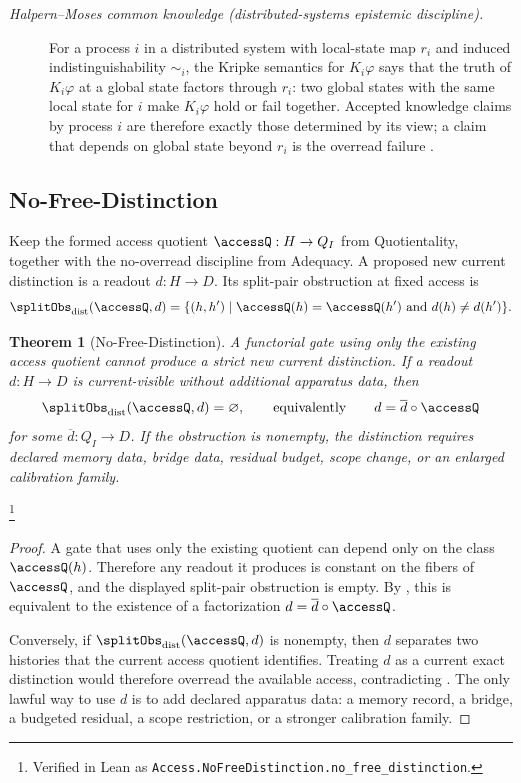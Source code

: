 \documentclass[11pt]{article}
\newtheorem{theorem}{Theorem}[section]
\theoremstyle{definition}
\begin{document}
\begin{description}
\item[\emph{Halpern--Moses common knowledge (distributed-systems
epistemic discipline).}]
For a process \(i\) in a distributed system with local-state map
\(r_i\) and induced indistinguishability \(\sim_i\), the Kripke
semantics for \(K_i\varphi\) says that the truth of
\(K_i\varphi\) at a global state factors through \(r_i\): two
global states with the same local state for \(i\) make
\(K_i\varphi\) hold or fail together.  Accepted knowledge claims
by process \(i\) are therefore exactly those determined by its
view; a claim that depends on global state beyond \(r_i\) is the
overread failure
\citep{HalpernMoses1990KnowledgeCommonKnowledge}.
\end{description}

\subsection{No-Free-Distinction}\label{sec:access:no-free-distinction}

Keep the formed access quotient \(\accessQ:H\to Q_I\) from
Quotientality, together with the no-overread discipline from
Adequacy.  A proposed new current distinction is a readout
\(d:H\to D\).  Its split-pair obstruction at fixed access is
\[
  \splitObs_{\mathrm{dist}}(\accessQ,d)
  =
  \{(h,h')\mid \accessQ(h)=\accessQ(h')\ \text{and}\ d(h)\ne d(h')\}.
\]

\begin{theorem}[No-Free-Distinction]\label{thm:F12}
A functorial gate using only the existing access quotient cannot
produce a strict new current distinction.  If a readout
\(d:H\to D\) is current-visible without additional apparatus data,
then
\[
  \splitObs_{\mathrm{dist}}(\accessQ,d)=\varnothing,
  \qquad\text{equivalently}\qquad
  d=\overline d\circ\accessQ
\]
for some \(\overline d:Q_I\to D\).  If the obstruction is nonempty,
the distinction requires declared memory data, bridge data, residual
budget, scope change, or an enlarged calibration family.
\end{theorem}
\footnote{Verified in Lean as
\texttt{Access.NoFreeDistinction.no\_free\_distinction}.}
\begin{proof}
A gate that uses only the existing quotient can depend only on the
class \(\accessQ(h)\).  Therefore any readout it produces is
constant on the fibers of \(\accessQ\), and the displayed
split-pair obstruction is empty.  By , this is
equivalent to the existence of a factorization
\(d=\overline d\circ\accessQ\).

Conversely, if \(\splitObs_{\mathrm{dist}}(\accessQ,d)\) is
nonempty, then \(d\) separates two histories that the current access
quotient identifies.  Treating \(d\) as a current exact distinction
would therefore overread the available access, contradicting
.  The only lawful way to use \(d\) is to add declared
apparatus data: a memory record, a bridge, a budgeted residual, a
scope restriction, or a stronger calibration family.
\end{proof}
\end{document}
